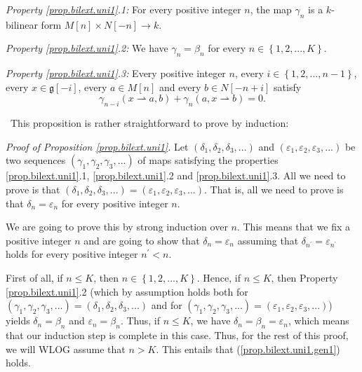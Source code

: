 \documentclass[etingof-lie.tex]{subfiles}
\begin{document}
\begin{noncompile}
\begin{proposition}
\textit{Property \ref{prop.bilext.uni1}.1:} For every positive integer $n$,
the map $\gamma_{n}$ is a $k$-bilinear form $M\left[  n\right]  \times
N\left[  -n\right]  \rightarrow k$.

\textit{Property \ref{prop.bilext.uni1}.2:} We have $\gamma_{n}=\beta_{n}$ for
every $n\in\left\{  1,2,...,K\right\}  $.

\textit{Property \ref{prop.bilext.uni1}.3:} Every positive integer $n$, every
$i\in\left\{  1,2,...,n-1\right\}  $, every $x\in\mathfrak{g}\left[
-i\right]  $, every $a\in M\left[  n\right]  $ and every $b\in N\left[
-n+i\right]  $ satisfy%
\begin{equation}
\gamma_{n-i}\left(  x\rightharpoonup a,b\right)  +\gamma_{n}\left(
a,x\rightharpoonup b\right)  =0. \label{prop.bilext.uni1.main}%
\end{equation}

\end{proposition}

\ This proposition is rather
straightforward to prove by induction:

\begin{vershort}
\textit{Proof of Proposition \ref{prop.bilext.uni1}.} Let $\left(  \delta
_{1},\delta_{2},\delta_{3},...\right)  $ and $\left(  \varepsilon
_{1},\varepsilon_{2},\varepsilon_{3},...\right)  $ be two sequences $\left(
\gamma_{1},\gamma_{2},\gamma_{3},...\right)  $ of maps satisfying the
properties \ref{prop.bilext.uni1}.1, \ref{prop.bilext.uni1}.2 and
\ref{prop.bilext.uni1}.3. All we need to prove is that $\left(  \delta
_{1},\delta_{2},\delta_{3},...\right)  =\left(  \varepsilon_{1},\varepsilon
_{2},\varepsilon_{3},...\right)  $. That is, all we need to prove is that
$\delta_{n}=\varepsilon_{n}$ for every positive integer $n$.

We are going to prove this by strong induction over $n$. This means that we
fix a positive integer $n$ and are going to show that $\delta_{n}%
=\varepsilon_{n}$ assuming that $\delta_{n^{\prime}}=\varepsilon_{n^{\prime}}$
holds for every positive integer $n^{\prime}<n$.

First of all, if $n\leq K$, then $n\in\left\{  1,2,...,K\right\}  $. Hence, if
$n\leq K$, then Property \ref{prop.bilext.uni1}.2 (which by assumption holds
both for $\left(  \gamma_{1},\gamma_{2},\gamma_{3},...\right)  =\left(
\delta_{1},\delta_{2},\delta_{3},...\right)  $ and for $\left(  \gamma
_{1},\gamma_{2},\gamma_{3},...\right)  =\left(  \varepsilon_{1},\varepsilon
_{2},\varepsilon_{3},...\right)  $) yields $\delta_{n}=\beta_{n}$ and
$\varepsilon_{n}=\beta_{n}$. Thus, if $n\leq K$, we have $\delta_{n}=\beta
_{n}=\varepsilon_{n}$, which means that our induction step is complete in this
case. Thus, for the rest of this proof, we will WLOG assume that $n>K$. This
entails that (\ref{prop.bilext.uni1.gen1}) holds.


\end{vershort}
\end{noncompile}
\end{document}
